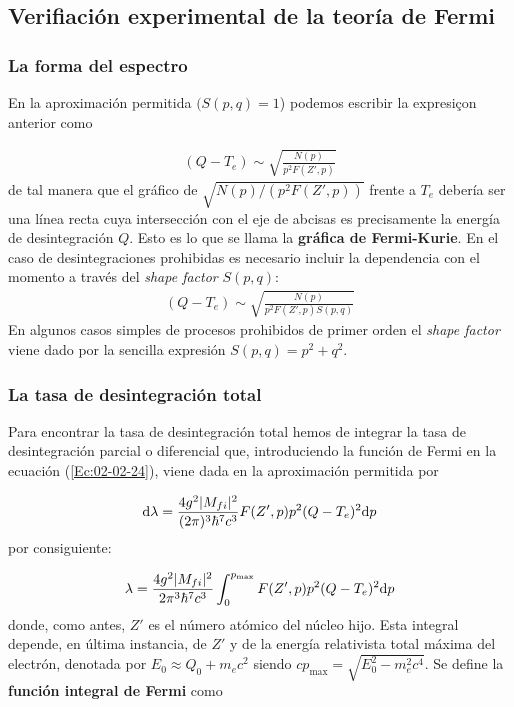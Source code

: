 \subsection{Verifiación experimental de la teoría de Fermi}

\subsubsection{La forma del espectro}

En la aproximación permitida $(S(p,q)=1$) podemos escribir la expresiçon anterior como

\begin{eqnarray}
	(Q-T_e) \sim \sqrt{\frac{N(p)}{p^2 F(Z',p)}}
\end{eqnarray}
de tal manera que el gráfico de $\sqrt{N(p)/(p^2 F(Z',p))}$ frente a $T_e$ debería ser una línea recta cuya intersección con el eje de abcisas es precisamente la energía de desintegración $Q$. Esto es lo que se llama la \textbf{gráfica de Fermi-Kurie}. En el caso de desintegraciones prohibidas es necesario incluir la dependencia con el momento a través del \textit{shape factor} $S(p,q)$:
\begin{eqnarray}
	(Q-T_e) \sim \sqrt{\frac{N(p)}{p^2 F(Z',p)S(p,q)}}
\end{eqnarray}
En algunos casos simples de procesos prohibidos de primer orden el \textit{shape factor} viene dado por la sencilla expresión $S(p,q)=p^2 + q^2$.

\subsubsection{La tasa de desintegración total}

Para encontrar la tasa de desintegración total hemos de integrar la tasa de desintegración parcial o diferencial que, introduciendo la función de Fermi en la ecuación (\ref{Ec:02-02-24}), viene dada en la aproximación permitida por 

\begin{eqnarray}
	\mathrm{d} \lambda = \frac{4g^2 |M_{fi}|^2}{(2\pi)^3 \hbar^7 c^3} F(Z',p)p^2 (Q-T_e)^2 \mathrm{d} p
\end{eqnarray}
por consiguiente:

\begin{equation}
	\lambda= \frac{4g^2 |M_{fi}|^2}{2\pi^3 \hbar^7 c^3} \int_0^{p_{\max}} F(Z',p)p^2 (Q-T_e)^2 \mathrm{d} p
\end{equation}
donde, como antes, $Z'$ es el número atómico del núcleo hijo. Esta integral depende, en última instancia, de $Z'$ y de la energía relativista total máxima del electrón, denotada por $E_0 \approx Q_0 + m_e c^2$ siendo $cp_{\max}=\sqrt{E_0^2 - m_e^2c^4}$. Se define la \textbf{función integral de Fermi} como


